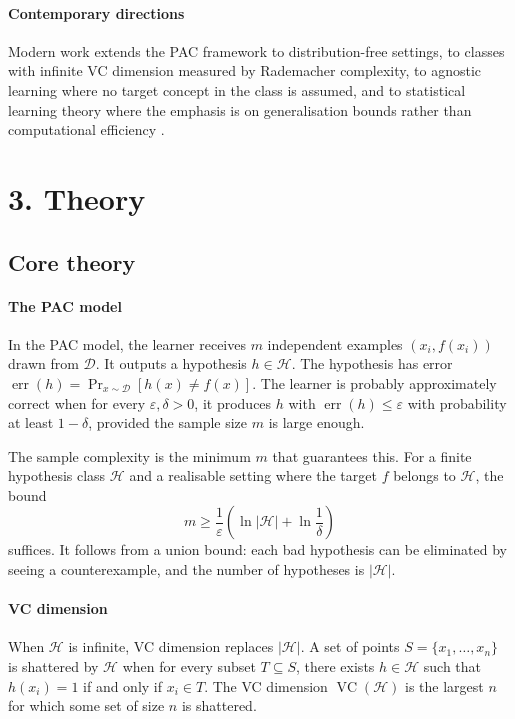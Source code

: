 \begin{historylist}
\paragraph{Contemporary directions}
Modern work extends the PAC framework to distribution-free settings, to classes with infinite VC dimension measured by Rademacher complexity, to agnostic learning where no target concept in the class is assumed, and to statistical learning theory where the emphasis is on generalisation bounds rather than computational efficiency \cite{colt_ref2}.

\end{historylist}
\section*{3. Theory}
\subsection*{Core theory}
\paragraph{The PAC model}
In the PAC model, the learner receives $m$ independent examples $(x_i,f(x_i))$ drawn from $\mathcal D$. It outputs a hypothesis $h\in\mathcal H$. The hypothesis has error $\operatorname{err}(h)=\Pr_{x\sim\mathcal D}[h(x)\neq f(x)]$. The learner is probably approximately correct when for every $\varepsilon,\delta>0$, it produces $h$ with $\operatorname{err}(h)\leq\varepsilon$ with probability at least $1-\delta$, provided the sample size $m$ is large enough.

The sample complexity is the minimum $m$ that guarantees this. For a finite hypothesis class $\mathcal H$ and a realisable setting where the target $f$ belongs to $\mathcal H$, the bound
\[
m\geq\frac{1}{\varepsilon}\left(\ln|\mathcal H|+\ln\frac{1}{\delta}\right)
\]
suffices. It follows from a union bound: each bad hypothesis can be eliminated by seeing a counterexample, and the number of hypotheses is $|\mathcal H|$.

\paragraph{VC dimension}
When $\mathcal H$ is infinite, VC dimension replaces $|\mathcal H|$. A set of points $S=\{x_1,\ldots,x_n\}$ is shattered by $\mathcal H$ when for every subset $T\subseteq S$, there exists $h\in\mathcal H$ such that $h(x_i)=1$ if and only if $x_i\in T$. The VC dimension $\operatorname{VC}(\mathcal H)$ is the largest $n$ for which some set of size $n$ is shattered.


